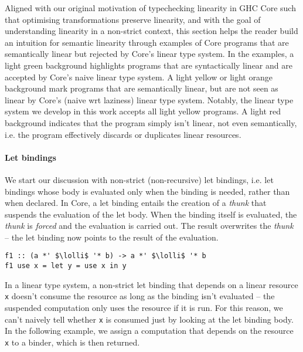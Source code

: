 \documentclass[acmsmall,review]{acmart}
\newcommand{\workingcolorname}{light green}
\newcommand{\notyetcolorname}{light yellow}
\newcommand{\nowaycolorname}{light red}
\newcommand{\limitationcolorname}{light orange}
\newcommand{\lolli}{\multimap}
\begin{document}
Aligned with our original motivation of typechecking linearity in GHC Core such
that optimising transformations preserve linearity, and with the goal
of understanding linearity in a non-strict context, this section helps the
reader build an intuition for semantic linearity through examples of Core
programs that are semantically linear but rejected by Core's linear type
system.
%
In the examples, a \colorbox{working}{\workingcolorname} background highlights programs that are
syntactically linear and are accepted by Core's naive linear type system. A
\colorbox{notyet}{\notyetcolorname} or \colorbox{limitation}{\limitationcolorname} background mark programs that are
semantically linear, but are not seen as linear by Core's (naive wrt laziness) linear type
system. Notably, the linear type system we develop in this work accepts all
\colorbox{notyet}{\notyetcolorname} programs.
A \colorbox{noway}{\nowaycolorname} background indicates that the program
simply isn't linear, not even semantically, i.e. the program effectively
discards or duplicates linear resources.

\paragraph{Let bindings}
We start our discussion with non-strict (non-recursive) let bindings, i.e. let bindings whose
body is evaluated only when the binding is needed, rather than when declared.
In Core, a let binding entails the creation of a \emph{thunk} that suspends the
evaluation of the let body.
When the binding itself is evaluated, the \emph{thunk} is
\emph{forced} and the evaluation is carried out. The result overwrites the
\emph{thunk} -- the let binding now points to the result of the evaluation.

    \begin{notyet}
\begin{lstlisting}
f1 :: (a *' $\lolli$ '* b) -> a *' $\lolli$ '* b
f1 use x = let y = use x in y
\end{lstlisting}
\end{notyet}
In a linear type system, a non-strict let binding that depends on a linear
resource \lstinline{x} doesn't consume the resource as long as the binding isn't
evaluated -- the suspended computation only uses the resource if it is run. For
this reason, we can't naively tell whether \lstinline{x} is consumed just by looking at
the let binding body. In the following example, we assign a computation that
depends on the resource \lstinline{x} to a binder, which is then
returned.
\end{document}
